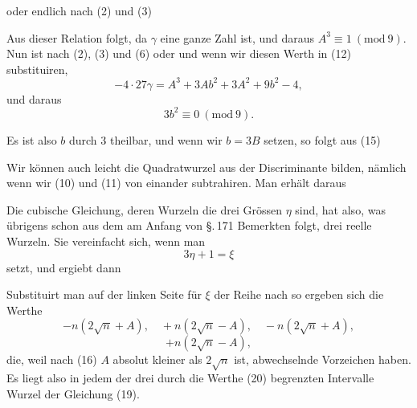 oder endlich nach (2) und (3)

Aus dieser Relation folgt, da $\gamma$ eine ganze Zahl ist,
und daraus $A^3 \equiv 1\ (\mathrm{mod}\ 9)$. Nun ist nach (2), (3) und (6)
oder
und wenn wir diesen Werth in (12) substituiren,
\[
-4\cdot 27\gamma = A^3 + 3Ab^2 + 3A^2 + 9b^2 - 4,
\]
und daraus
\[
3b^2 \equiv 0\ (\mathrm{mod}\ 9).
\]

Es ist also $b$ durch 3 theilbar, und wenn wir $b = 3B$ setzen,
so folgt aus (15)

Wir können auch leicht die Quadratwurzel aus der Dis\-criminante bilden, nämlich
wenn wir (10) und (11) von einander subtrahiren. Man erhält
daraus

Die cubische Gleichung, deren Wurzeln die drei Grössen $\eta$
sind, hat also, was übrigens schon aus dem am Anfang von
\S.\,171 Bemerkten folgt, drei reelle Wurzeln. Sie vereinfacht
sich, wenn man
\[
3\eta + 1 = \xi
\]
setzt, und ergiebt dann

Substituirt man auf der linken Seite für $\xi$ der Reihe nach
so ergeben sich die Werthe
\[
-n(2\sqrt{n} + A), \quad +n(2\sqrt{n} - A), \quad -n(2\sqrt{n} + A),
\]
\[
+n(2\sqrt{n} - A),
\]
die, weil nach (16) $A$ absolut kleiner als $2\sqrt{n}$ ist, abwechselnde
Vorzeichen haben. Es liegt also in jedem der drei durch die
Werthe (20) begrenzten Intervalle  Wurzel der Gleichung (19).
